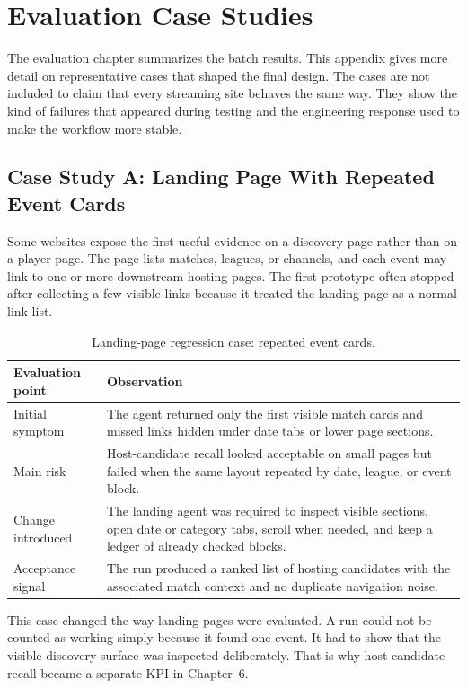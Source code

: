 \chapter{Evaluation Case Studies}
\label{app:evaluation-cases}

The evaluation chapter summarizes the batch results. This appendix gives more
detail on representative cases that shaped the final design. The cases are not
included to claim that every streaming site behaves the same way. They show the
kind of failures that appeared during testing and the engineering response used
to make the workflow more stable.

\section{Case Study A: Landing Page With Repeated Event Cards}

Some websites expose the first useful evidence on a discovery page rather than
on a player page. The page lists matches, leagues, or channels, and each event
may link to one or more downstream hosting pages. The first prototype often
stopped after collecting a few visible links because it treated the landing page
as a normal link list.

\begin{table}[!htbp]
\centering
\begin{tabularx}{\textwidth}{Q{3.8cm}Y}
\toprule
{}
Evaluation point & Observation \\
\midrule
Initial symptom & The agent returned only the first visible match cards and
missed links hidden under date tabs or lower page sections. \\
Main risk & Host-candidate recall looked acceptable on small pages but failed
when the same layout repeated by date, league, or event block. \\
Change introduced & The landing agent was required to inspect visible sections,
open date or category tabs, scroll when needed, and keep a ledger of already
checked blocks. \\
Acceptance signal & The run produced a ranked list of hosting candidates with
the associated match context and no duplicate navigation noise. \\
\bottomrule
\end{tabularx}
\caption{Landing-page regression case: repeated event cards.}
\label{tab:case-landing-repeated-cards}
\end{table}

This case changed the way landing pages were evaluated. A run could not be
counted as working simply because it found one event. It had to show that the
visible discovery surface was inspected deliberately. That is why host-candidate
recall became a separate KPI in Chapter~6.

